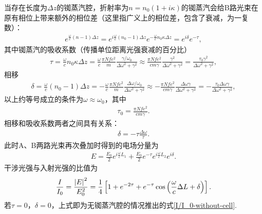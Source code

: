 \documentclass{assignment}
\begin{document}
当存在长度为$\Delta z$的铷蒸汽腔，折射率为$n=n_0(1+i\kappa)$的铷蒸汽会给B路光束在原有相位上带来额外的相位差（这里指广义上的相位差，包含了衰减，为一复数）：
\begin{align}
    e^{\frac{\omega}{c}(n-1)\Delta z}=e^{i\frac{\omega}{c}(n_0-1)\Delta z}e^{-\frac{\omega}{c}n_0\kappa\Delta z}=e^{i\delta}e^{-\tau},
\end{align}
其中铷蒸汽的吸收系数（传播单位距离光强衰减的百分比）
\begin{align}
    \tau=\frac{\omega}{c}n_0\kappa\Delta z=\frac{\omega}{c}\frac{\pi Nfe^2}{m}\frac{\gamma/\omega_0}{\Delta\omega^2+\gamma^2}\approx\frac{\pi Nfe^2}{cm\gamma}\frac{\gamma^2}{\Delta\omega^2+\gamma^2}=\frac{\tau_0\gamma^2}{\Delta\omega^2+\gamma^2},
\end{align}
相移
\begin{align}
    \delta=\frac{\omega}{c}(n_0-1)\Delta z=-\frac{\omega}{c}\frac{\pi Nfe^2}{m}\frac{\Delta\omega/\omega_0}{\Delta\omega^2+\gamma^2}\approx-\frac{\pi Nfe^2}{cm\gamma}\frac{\Delta\omega\gamma}{\Delta\omega^2+\gamma^2}=-\frac{\tau_0\Delta\omega\gamma}{\Delta\omega^2+\gamma^2},
\end{align}
以上约等号成立的条件为$\omega\approx\omega_0$，其中
\begin{align}
    \tau_0=\frac{\pi Nfe^2}{cm\gamma}.
\end{align}
相移和吸收系数两者之间具有关系：
\begin{align}
    \delta=-\tau\frac{\Delta\omega}{\tau}.
\end{align}
此时A、B两路光束再次叠加时得到的电场分量为
\begin{align}
    E=\frac{E_0}{2}e^{i\frac{\omega}{c}L_1}+\frac{E_0}{2}e^{-\tau}e^{i\frac{\omega}{c}L_2}e^{i\delta}.
\end{align}
干涉光强与入射光强的比值为
\begin{align}
    \frac{I}{I_0}=\frac{\left\lvert E\right\rvert^2}{E_0^2}=\frac{1}{4}\left[1+e^{-2\tau}+e^{-\tau}\cos\left(\frac{\omega}{c}\Delta L+\delta\right)\right].
\end{align}
若$\tau=0$，$\delta=0$，上式即为无铷蒸汽腔的情况推出的式\eqref{I/I_0-without-cell}.
\end{document}

